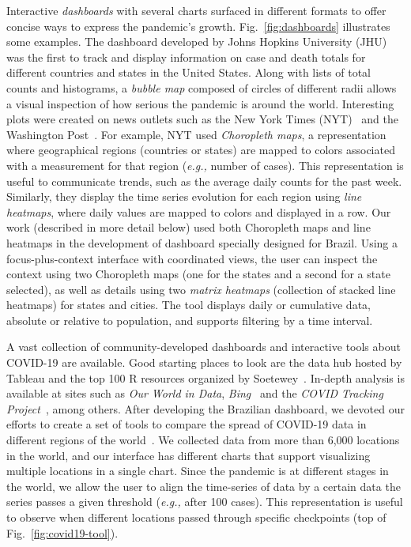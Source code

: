 \documentclass[10pt,journal,compsoc]{IEEEtran}
\newcommand{\eg}{\emph{e.g.,}\xspace}
\newcommand{\cv}{COVID-19\xspace}
\begin{document}
Interactive \emph{dashboards} with several charts surfaced in different formats to offer concise ways to express the pandemic's growth. Fig.~\ref{fig:dashboards} illustrates some examples. The dashboard developed by Johns Hopkins University (JHU)~\cite{dashboardJHU} was the first to track and display information on case and death totals for different countries and states in the United States. Along with lists of total counts and histograms, a \emph{bubble map} composed of circles of different radii allows a visual inspection of how serious the pandemic is around the world. Interesting plots were created on news outlets such as the New York Times (NYT)~\cite{NYT,WP} and the Washington Post~\cite{WP}. For example, NYT used \emph{Choropleth maps}, a representation where geographical regions (countries or states) are mapped to colors associated with a measurement for that region (\eg number of cases). This representation is useful to communicate trends, such as the average daily counts for the past week. Similarly, they display the time series evolution for each region using \emph{line heatmaps}, where daily values are mapped to colors and displayed in a row.
Our work (described in more detail below) used both Choropleth maps and line heatmaps in the development of dashboard specially designed for Brazil. Using a focus-plus-context interface with coordinated views, the user can inspect the context using two Choropleth maps (one for the states and a second for a state selected), as well as details using two \emph{matrix heatmaps} (collection of stacked line heatmaps) for states and cities. The tool displays daily or cumulative data, absolute or relative to population, and supports filtering by a time interval.

%
A vast collection of community-developed dashboards and interactive tools about \cv are available. Good starting places to look are the data hub hosted by Tableau and the top 100 R resources organized by Soetewey~\cite{R-resources}. In-depth analysis is available at sites such as \emph{Our World in Data}\cite{OWID},  \emph{Bing}~\cite{BING} and the \emph{COVID Tracking Project}~\cite{COVID-TRACKING}, among others. After developing the Brazilian dashboard, we devoted our efforts to create a set of tools to compare the spread of \cv data in different regions of the world~\cite{covid19-tools}. We collected data from more than 6,000 locations in the world, and our interface has different charts that support visualizing multiple locations in a single chart. Since the pandemic is at different stages in the world, we allow the user to align the time-series of data by a certain data the series passes a given threshold (\eg after 100 cases). This representation is useful to observe when different locations passed through specific checkpoints (top of Fig.~\ref{fig:covid19-tool}).
\end{document}
